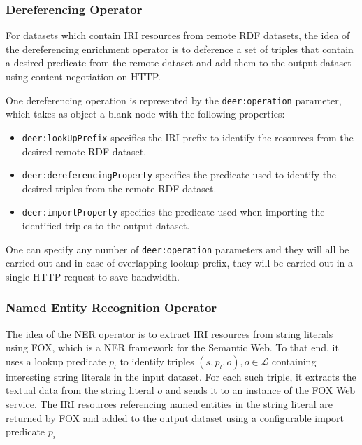 \subsubsection*{Dereferencing Operator}

For datasets which contain \ac{IRI} resources from remote \ac{RDF} datasets, the idea of the dereferencing enrichment operator is to deference a set of triples that contain a desired predicate from the remote dataset and add them to the output dataset using content negotiation on \ac{HTTP}.

One dereferencing operation is represented by the \texttt{deer:operation} parameter, which takes as object a blank node with the following properties:

\begin{itemize}
  \item \texttt{deer:lookUpPrefix} specifies the \ac{IRI} prefix to identify the resources from the desired remote \ac{RDF} dataset.
  \item \texttt{deer:dereferencingProperty} specifies the predicate used to identify the desired triples from the remote \ac{RDF} dataset.
  \item \texttt{deer:importProperty} specifies the predicate used when importing the identified triples to the output dataset.
\end{itemize}

One can specify any number of \texttt{deer:operation} parameters and they will all be carried out and in case of overlapping lookup prefix, they will be carried out in a single \ac{HTTP} request to save bandwidth.

\subsubsection*{Named Entity Recognition Operator}

The idea of the \ac{NER} operator is to extract \ac{IRI} resources from string literals using \ac{FOX}\cite{speck:2014a}, which is a \ac{NER} framework for the Semantic Web.
To that end, it uses a lookup predicate $p_l$ to identify triples $(s,p_l,o), o\in \mathcal{L}$ containing interesting string literals in the input dataset.
For each such triple, it extracts the textual data from the string literal $o$ and sends it to an instance of the \ac{FOX} Web service.
The \ac{IRI} resources referencing named entities in the string literal are returned by \ac{FOX} and added to the output dataset using a configurable import predicate $p_i$

